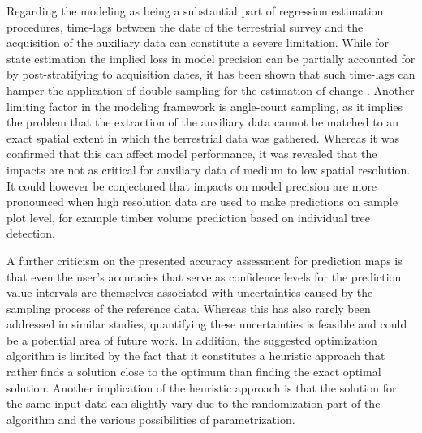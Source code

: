 Regarding the modeling as being a substantial part of regression estimation procedures, time-lags between the date of the terrestrial survey and the acquisition of the auxiliary data can constitute a severe limitation. While for state estimation the implied loss in model precision can be partially accounted for by post-stratifying to acquisition dates, it has been shown that such time-lags can hamper the application of double sampling for the estimation of change \citep{massey2015_thesis}. Another limiting factor in the modeling framework is angle-count sampling, as it implies the problem that the extraction of the auxiliary data cannot be matched to an exact spatial extent in which the terrestrial data was gathered. Whereas it was confirmed that this can affect model performance, it was revealed that the impacts are not as critical for auxiliary data of medium to low spatial resolution. It could however be conjectured that impacts on model precision are more pronounced when high resolution data are used to make predictions on sample plot level, for example timber volume prediction based on individual tree detection.\par

A further criticism on the presented accuracy assessment for prediction maps is that even the user's accuracies that serve as confidence levels for the prediction value intervals are themselves associated with uncertainties caused by the sampling process of the reference data. Whereas this has also rarely been addressed in similar studies, quantifying these uncertainties is feasible and could be a potential area of future work. In addition, the suggested optimization algorithm is limited by the fact that it constitutes a heuristic approach that rather finds a solution close to the optimum than finding the exact optimal solution. Another implication of the heuristic approach is that the solution for the same input data can slightly vary due to the randomization part of the algorithm and the various possibilities of parametrization.


